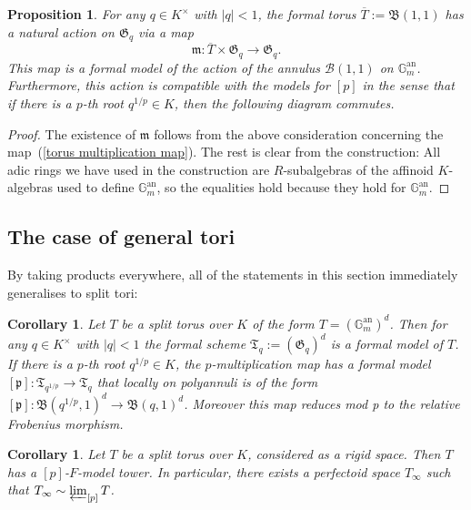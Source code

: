 \documentclass[11pt,oneside]{amsart}
\newtheorem{proposition}[theorem]{Proposition}
\newtheorem{corollary}[theorem]{Corollary}
\theoremstyle{definition}
\theoremstyle{remark}
\begin{document}
	\begin{proposition}\label{action on formal model of torus}
		For any $q\in K^\times$ with $|q|<1$, the formal torus $\overline{T}:=\mathfrak B(1,1)$ has a natural action on $\mathfrak G_q$ via a map
		\[\mathfrak m:\overline{T}\times \mathfrak G_q\rightarrow \mathfrak G_q.\]
		This map is a formal model of the action of the annulus $\mathcal B(1,1)$ on $\mathbb G_m^{\operatorname{an}}$. Furthermore, this action is compatible with the models for $[p]$ in the sense that if there is a $p$-th root $q^{1/p}\in K$, then the following diagram commutes.
		\begin{center}
		\end{center}
	\end{proposition} 
	\begin{proof}
		The existence of $\mathfrak m$ follows from the above consideration concerning the map~(\ref{torus multiplication map}). The rest is clear from the construction: All adic rings we have used in the construction are $R$-subalgebras of the affinoid $K$-algebras used to define $\mathbb G_m^{\operatorname{an}}$, so the equalities hold because they hold for $\mathbb G_m^{\operatorname{an}}$.
	\end{proof}
	
	\subsection{The case of general tori}
	By taking products everywhere, all of the statements in this section immediately generalises to split tori:
	\begin{corollary}\label{torus has formal models}
		Let $T$ be a split torus over $K$ of the form $T=(\mathbb G_m^{\operatorname{an}})^d$. Then for any $q\in K^\times$ with $|q|<1$ the formal scheme $\mathfrak T_q := (\mathfrak G_q)^d$ is a formal model of $T$. If there is a $p$-th root $q^{1/p}\in K$, the $p$-multiplication map has a formal model $[\mathfrak p]:\mathfrak T_{q^{1/p}}\rightarrow \mathfrak T_{q}$ that locally on polyannuli is of the form $[\mathfrak p]:\mathfrak B(q^{1/p},1)^d\rightarrow \mathfrak B(q,1)^d$. Moreover this map reduces mod p to the relative Frobenius morphism.
	\end{corollary}
	\begin{corollary}\label{torus has p-F-model tower and has perfectoid tilde-limit}
		Let $T$ be a split torus over $K$, considered as a rigid space. Then $T$ has a $[p]$-$F$-model tower. In particular, there exists a perfectoid space $T_\infty$ such that $T_\infty \sim \varprojlim_{[p]} T$. 
	\end{corollary}
	
\end{document}

